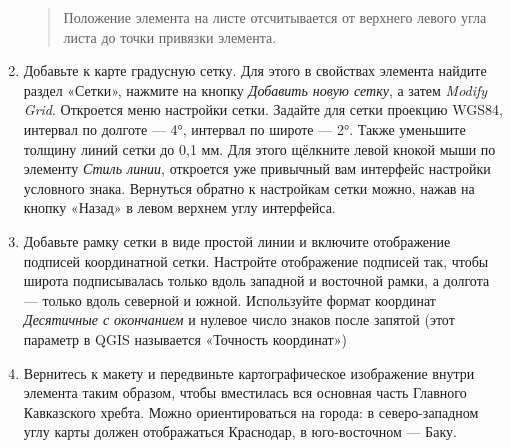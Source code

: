 \documentclass[
  12pt,
]{book}
\begin{document}
\begin{enumerate}
  \begin{quote}
  Положение элемента на листе отсчитывается от верхнего левого угла листа до точки привязки элемента.
  \end{quote}
\item
  Добавьте к карте градусную сетку. Для этого в свойствах элемента найдите раздел «Сетки», нажмите на кнопку \emph{Добавить новую сетку}, а затем \emph{Modify Grid}. Откроется меню настройки сетки. Задайте для сетки проекцию WGS84, интервал по долготе --- 4°, интервал по широте --- 2°. Также уменьшите толщину линий сетки до 0,1 мм. Для этого щёлкните левой кнокой мыши по элементу \emph{Стиль линии}, откроется уже привычный вам интерфейс настройки условного знака. Вернуться обратно к настройкам сетки можно, нажав на кнопку «Назад» в левом верхнем углу интерфейса.
\item
  Добавьте рамку сетки в виде простой линии и включите отображение подписей координатной сетки. Настройте отображение подписей так, чтобы широта подписывалась только вдоль западной и восточной рамки, а долгота --- только вдоль северной и южной. Используйте формат координат \emph{Десятичные с окончанием} и нулевое число знаков после запятой (этот параметр в QGIS называется «Точность координат»)
\item
  Вернитесь к макету и передвиньте картографическое изображение внутри элемента таким образом, чтобы вместилась вся основная часть Главного Кавказского хребта. Можно ориентироваться на города: в северо-западном углу карты должен отображаться Краснодар, в юго-восточном --- Баку.


\end{enumerate}
\end{document}
